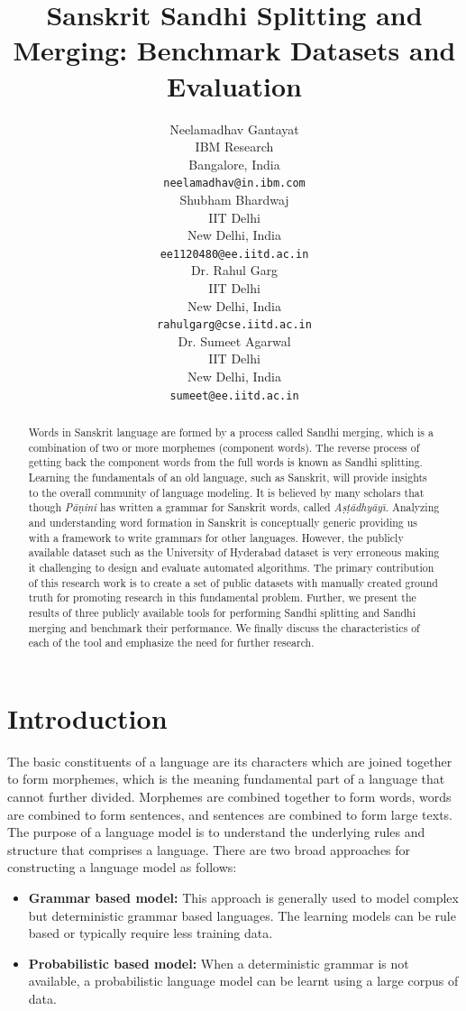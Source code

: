 \documentclass[11pt]{article}
\title{Sanskrit Sandhi Splitting and Merging: Benchmark Datasets and Evaluation}
\author{Neelamadhav Gantayat\\
	IBM Research \\
	Bangalore, India \\
	{\tt neelamadhav@in.ibm.com} \\\And
	Shubham Bhardwaj \\
	IIT Delhi \\
	New Delhi, India \\
	{\tt ee1120480@ee.iitd.ac.in} \\\And
	Dr. Rahul Garg \\
	 IIT Delhi \\
	  New Delhi, India \\
	  {\tt rahulgarg@cse.iitd.ac.in} \\\And
	  Dr. Sumeet Agarwal \\
	  IIT Delhi \\
	 New Delhi, India \\
	  {\tt sumeet@ee.iitd.ac.in} \\}
\date{}
\begin{document}
	\maketitle
\begin{abstract}
	Words in Sanskrit language are formed by a process called Sandhi merging, which is a combination of two or more morphemes (component words). The reverse process of getting back the component words from the full words is known as Sandhi splitting. Learning the fundamentals of an old language, such as Sanskrit, will provide insights to the overall community of language modeling. It is believed by many scholars that though \textit{P\={a}\d{n}ini} has written a grammar for Sanskrit words, called \textit{A\d{s}\d{t}\={a}dhy\={a}y\={\i}}. Analyzing and understanding word formation in Sanskrit is conceptually generic providing us with a framework to write grammars for other languages. However, the publicly available dataset such as the University of Hyderabad dataset is very erroneous making it challenging to design and evaluate automated algorithms. The primary contribution of this research work is to create a set of public datasets with manually created ground truth for promoting research in this fundamental problem. Further, we present the results of three publicly available tools for performing Sandhi splitting and Sandhi merging and benchmark their performance. We finally discuss the characteristics of each of the tool and emphasize the need for further research.
\end{abstract}

\section{Introduction}

The basic constituents of a language are its characters which are joined together to form morphemes, which is the meaning fundamental part of a language that cannot further divided. Morphemes are combined together to form words, words are combined to form sentences, and sentences are combined to form large texts. The purpose of a language model is to understand the underlying rules and structure that comprises a language. There are two broad approaches for constructing a language model as follows:
\begin{itemize}
	\item \textbf{Grammar based model:} This approach is generally used to model complex but deterministic grammar based languages. The learning models can be rule based or typically require less training data.
	\item \textbf{Probabilistic based model:} When a deterministic grammar is not available, a probabilistic language model can be learnt using a large corpus of data.
\end{itemize}
\end{document}
